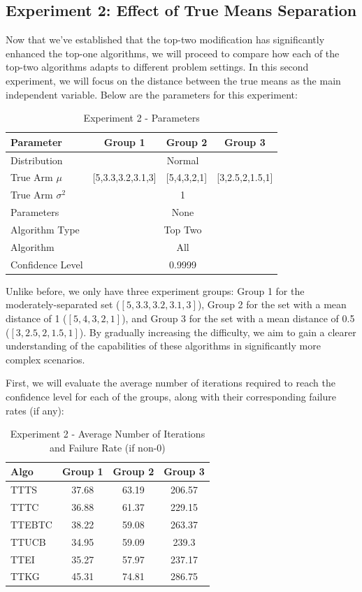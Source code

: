 \documentclass[a4paper, 12pt]{article}
\theoremstyle{definition}
\begin{document}
\subsection{Experiment 2: Effect of True Means Separation}
Now that we've established that the top-two modification has significantly enhanced the top-one algorithms, we will proceed to compare how each of the top-two algorithms adapts to different problem settings. In this second experiment, we will focus on the distance between the true means as the main independent variable. Below are the parameters for this experiment:

\begin{table}[hbt!]
\centering
\begin{tabular}{lccc}
\hline
Parameter & Group 1 & Group 2 & Group 3 \\
\hline
Distribution & \multicolumn{3}{c}{Normal} \\
True Arm $\mu$ & [5,3.3,3.2,3.1,3] & [5,4,3,2,1] & [3,2.5,2,1.5,1] \\
True Arm $\sigma^2$ & \multicolumn{3}{c}{1} \\
Parameters & \multicolumn{3}{c}{None} \\
Algorithm Type & \multicolumn{3}{c}{Top Two} \\
Algorithm & \multicolumn{3}{c}{All} \\
Confidence Level & \multicolumn{3}{c}{0.9999} \\
\hline
\end{tabular}
\caption{Experiment 2 - Parameters}
\label{table:exp2_param}
\end{table}

Unlike before, we only have three experiment groups: Group 1 for the moderately-separated set ($[5,3.3,3.2,3.1,3]$), Group 2 for the set with a mean distance of 1 ($[5,4,3,2,1]$), and Group 3 for the set with a mean distance of 0.5 ($[3,2.5,2,1.5,1]$). By gradually increasing the difficulty, we aim to gain a clearer understanding of the capabilities of these algorithms in significantly more complex scenarios.

First, we will evaluate the average number of iterations required to reach the confidence level for each of the groups, along with their corresponding failure rates (if any):

\begin{table}[hbt!]
\centering
\begin{tabular}{lccc}
\hline
Algo & Group 1 & Group 2 & Group 3 \\
\hline
TTTS & 37.68 & 63.19 & 206.57 \\
TTTC & 36.88 & 61.37 & 229.15 \\
TTEBTC & 38.22 & 59.08 & 263.37 \\
TTUCB & 34.95 & 59.09 & 239.3 \\
TTEI & 35.27 & 57.97 & 237.17 \\
TTKG & 45.31 & 74.81 & 286.75 \\
\hline
\end{tabular}
\caption{Experiment 2 - Average Number of Iterations and Failure Rate (if non-0)}
\label{table:exp2_iter}
\end{table}
\end{document}
